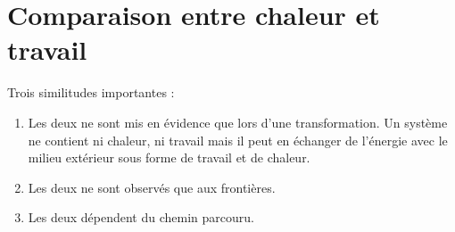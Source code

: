 \section{Comparaison entre chaleur et travail}
Trois similitudes importantes :
\begin{enumerate}
	\item Les deux ne sont mis en évidence que lors d'une transformation. 
	      Un système ne contient ni chaleur, ni travail mais il peut en échanger 
	      de l'énergie avec le milieu extérieur sous forme de travail et de chaleur.
	\item Les deux ne sont observés que aux frontières.
	\item Les deux dépendent du chemin parcouru.
\end{enumerate}


